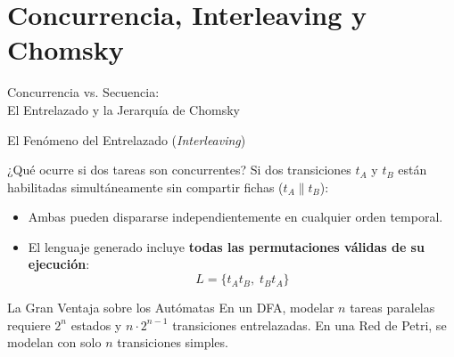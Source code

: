 \documentclass[10pt, aspectratio=169]{beamer}
\begin{document}
\section{Concurrencia, Interleaving y Chomsky}

\begin{frame}{}
	\centering
	\Huge{Concurrencia vs. Secuencia: \\ El Entrelazado y la Jerarquía de Chomsky}
\end{frame}

\begin{frame}{El Fenómeno del Entrelazado (\emph{Interleaving})}
	\begin{block}{¿Qué ocurre si dos tareas son concurrentes?}
		Si dos transiciones $t_A$ y $t_B$ están habilitadas simultáneamente sin compartir fichas ($t_A \parallel t_B$):
		\begin{itemize}
			\item Ambas pueden dispararse independientemente en cualquier orden temporal.
			\item El lenguaje generado incluye \textbf{todas las permutaciones válidas de su ejecución}:
			\[ L = \{ t_A t_B, \; t_B t_A \} \]
		\end{itemize}
	\end{block}

	\begin{alertblock}{La Gran Ventaja sobre los Autómatas}
		En un DFA, modelar $n$ tareas paralelas requiere $2^n$ estados y $n \cdot 2^{n-1}$ transiciones entrelazadas. En una Red de Petri, se modelan con solo $n$ transiciones simples.
	\end{alertblock}
\end{frame}
\end{document}
